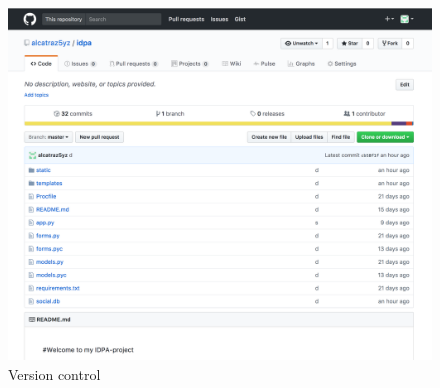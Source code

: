 \documentclass{article}
\begin{document}
\begin{figure}[ht]
    \centering
    \includegraphics[width=.7\linewidth]{github-repo}
    \caption{Version control}
    \label{fig:sub1}
    \end{figure}


\cleardoublepage











%
%
%
\end{document}
